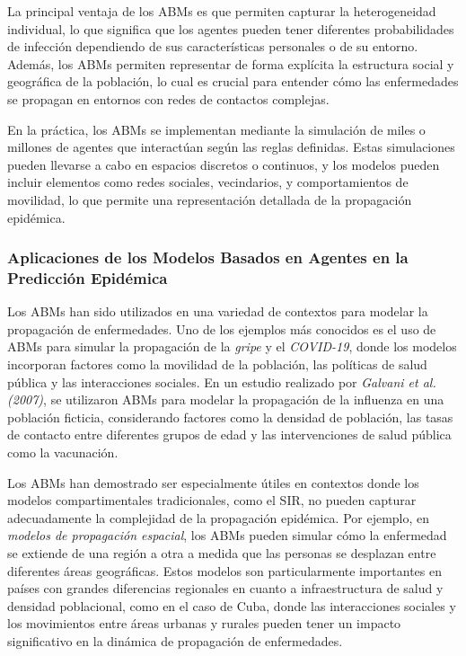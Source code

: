 La principal ventaja de los ABMs es que permiten capturar la heterogeneidad individual, lo que significa que los agentes pueden tener diferentes probabilidades de infección dependiendo de sus características personales o de su entorno. Además, los ABMs permiten representar de forma explícita la estructura social y geográfica de la población, lo cual es crucial para entender cómo las enfermedades se propagan en entornos con redes de contactos complejas.

En la práctica, los ABMs se implementan mediante la simulación de miles o millones de agentes que interactúan según las reglas definidas. Estas simulaciones pueden llevarse a cabo en espacios discretos o continuos, y los modelos pueden incluir elementos como redes sociales, vecindarios, y comportamientos de movilidad, lo que permite una representación detallada de la propagación epidémica.

\subsubsection{Aplicaciones de los Modelos Basados en Agentes en la Predicción Epidémica}

Los ABMs han sido utilizados en una variedad de contextos para modelar la propagación de enfermedades. Uno de los ejemplos más conocidos es el uso de ABMs para simular la propagación de la \textit{gripe} y el \textit{COVID-19}, donde los modelos incorporan factores como la movilidad de la población, las políticas de salud pública y las interacciones sociales. En un estudio realizado por \textit{Galvani et al. (2007)}, se utilizaron ABMs para modelar la propagación de la influenza en una población ficticia, considerando factores como la densidad de población, las tasas de contacto entre diferentes grupos de edad y las intervenciones de salud pública como la vacunación.

Los ABMs han demostrado ser especialmente útiles en contextos donde los modelos compartimentales tradicionales, como el SIR, no pueden capturar adecuadamente la complejidad de la propagación epidémica. Por ejemplo, en \textit{modelos de propagación espacial}, los ABMs pueden simular cómo la enfermedad se extiende de una región a otra a medida que las personas se desplazan entre diferentes áreas geográficas. Estos modelos son particularmente importantes en países con grandes diferencias regionales en cuanto a infraestructura de salud y densidad poblacional, como en el caso de Cuba, donde las interacciones sociales y los movimientos entre áreas urbanas y rurales pueden tener un impacto significativo en la dinámica de propagación de enfermedades.

